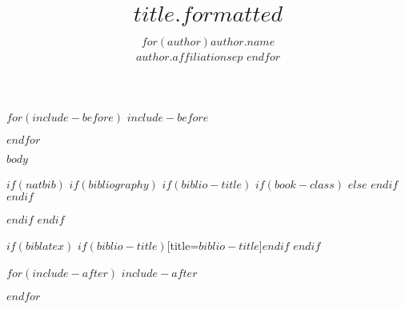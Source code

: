 \documentclass[
$for(classoption)$
  $classoption$$sep$,
$endfor$
]{$documentclass$}
\author{
$for(author)$$author.name$\\$author.affiliation$$sep$ \And $endfor$
}
\title{$title.formatted$}
\begin{document}
$for(include-before)$
$include-before$

$endfor$


$body$

$if(natbib)$
$if(bibliography)$
$if(biblio-title)$
$if(book-class)$
\renewcommand\bibname{$biblio-title$}
$else$
\renewcommand\refname{$biblio-title$}
$endif$
$endif$

$endif$
$endif$

$if(biblatex)$
\printbibliography$if(biblio-title)$[title=$biblio-title$]$endif$
$endif$

$for(include-after)$
$include-after$

$endfor$
\end{document}
